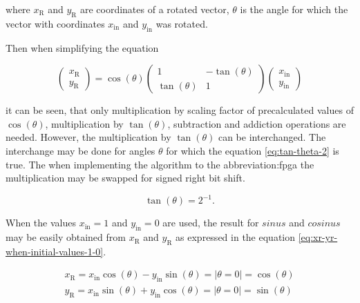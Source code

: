 \documentclass[a4paper, twoside, 11pt]{article}
\begin{document}
        where $x_\text{R}$ and $y_\text{R}$ are coordinates of a rotated vector, $\theta$ is the angle for which the vector with coordinates $x_\text{in}$ and $y_\text{in}$ was rotated.\par
        Then when simplifying the equation


        \begin{equation}\label{eq:rotation-simplifying}
             \begin{pmatrix}
                 x_\text{R}\\
                 y_\text{R}
             \end{pmatrix}
             = \cos (\theta)
             \begin{pmatrix}
                 1 & -\tan (\theta)\\
                 \tan (\theta) & 1
             \end{pmatrix}
             \begin{pmatrix}
                 x_\text{in}\\
                 y_\text{in}
             \end{pmatrix}
        \end{equation}

        \noindent it can be seen, that only multiplication by scaling factor of precalculated values of $\cos (\theta)$, multiplication by $\tan (\theta)$, subtraction and addiction operations are needed. However, the multiplication by $\tan (\theta)$ can be interchanged. The interchange may be done for angles $\theta$ for which the equation \ref{eq:tan-theta-2} is true. The when implementing the algorithm to the \gls{abbreviation:fpga} the multiplication may be swapped for signed right bit shift.

        \begin{equation}\label{eq:tan-theta-2}
            \tan (\theta) = 2^{-1}.
        \end{equation}
        \par
        When the values $x_\text{in} = 1$ and $y_\text{in} = 0$ are used, the result for $sinus$ and $cosinus$ may be easily obtained from $x_\text{R}$ and $y_\text{R}$ as expressed in the equation \ref{eq:xr-yr-when-initial-values-1-0}.

        \begin{equation}\label{eq:xr-yr-when-initial-values-1-0}
            \begin{gathered}
            x_\text{R} = x_\text{in} \cos (\theta) - y_\text{in} \sin (\theta) = | \theta = 0 | = \cos (\theta)\\
            y_\text{R} = x_\text{in} \sin (\theta) + y_\text{in} \cos (\theta) = | \theta = 0 | = \sin (\theta)
            \end{gathered}
        \end{equation}
\end{document}
